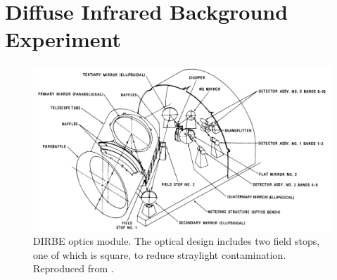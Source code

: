 \documentclass{aa}
\begin{document}
\section{Diffuse Infrared Background Experiment}
\label{sec:dirbe}

\begin{figure}
	\centering
	\includegraphics[width=\linewidth]{figs/DIRBE_optics.png}
	\caption{DIRBE optics module. The optical design includes two field stops, one of which is square, to reduce straylight contamination. Reproduced from \cite{magner87}.
	}
	\label{fig:optics_model}
\end{figure}
\end{document}
